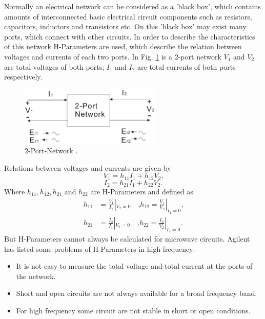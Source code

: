Normally an electrical network can be considered as a 'black box', which contains amounts of interconnected basic electrical circuit components such as resistors, capacitors, inductors and transistors etc. On this 'black box' may exist many ports, which connect with other circuits. In order to describe the characteristics of this network H-Parameters are used, which describe the relation between voltages and currents of each two ports. In Fig. \ref{fig:2_port_network} is a 2-port network $V_{1}$ and $V_{2}$ are total voltages of both ports; $I_{1}$ and $I_{2}$ are total currents of both ports respectively.\\
 
\begin{figure}[!ht]
\centering
\includegraphics[width=0.6\textwidth]{bilder/s_parameters}
\caption{2-Port-Network \cite{aglient_s_parameters}.}
\label{fig:2_port_network}
\end{figure}
Relations between voltages and currents are given by %
\begin{equation}
V_{1}=h_{11}I_{1}+h_{12}V_{2} \text{,}
\label{eq:voltage_current1}
\end{equation}
\begin{equation}
I_{2}=h_{21}I_{1}+h_{22}V_{2} \text{.}
\label{eq:voltage_current2}
\end{equation}
Where $h_{11},h_{12},h_{21}$ and $h_{22}$ are H-Parameters and defined as %
\begin{align*}
h_{11}&=\frac{V_{1}}{I_{1}}|_{V_{2}=0}\quad\text{,} h_{12}=\frac{V_{1}}{V_{2}}|_{I_{1}=0}\text{,}
\\
h_{21}&=\frac{I_{2}}{I_{1}}|_{V_{2}=0}\quad\text{,} h_{22}=\frac{I_{2}}{V_{2}}|_{I_{1}=0}\text{.}
\end{align*}
But H-Parameters cannot always be calculated for microwave circuits. Agilent\cite{aglient_s_parameters} has listed some problems of H-Parameters in high frequency:
\begin{itemize}
\item It is not easy to measure the total voltage and total current at the ports of the network.
\item Short and open circuits are not always available for a broad frequency band.
\item For high frequency some circuit are not stable in short or open conditions.
\end{itemize}
